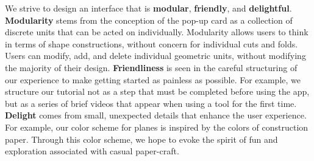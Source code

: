 We strive to design an interface that is \textbf{modular},
\textbf{friendly}, and \textbf{delightful}. \textbf{Modularity} stems
from the conception of the pop-up card as a collection of discrete units
that can be acted on individually. Modularity allows users to think in
terms of shape constructions, without concern for individual cuts and
folds. Users can modify, add, and delete individual geometric units,
without modifying the majority of their design. \textbf{Friendliness} is
seen in the careful structuring of our experience to make getting
started as painless as possible. For example, we structure our tutorial
not as a step that must be completed before using the app, but as a
series of brief videos that appear when using a tool for the first time.
\textbf{Delight} comes from small, unexpected details that enhance the
user experience. For example, our color scheme for planes is inspired by
the colors of construction paper. Through this color scheme, we hope to
evoke the spirit of fun and exploration associated with casual
paper-craft.
